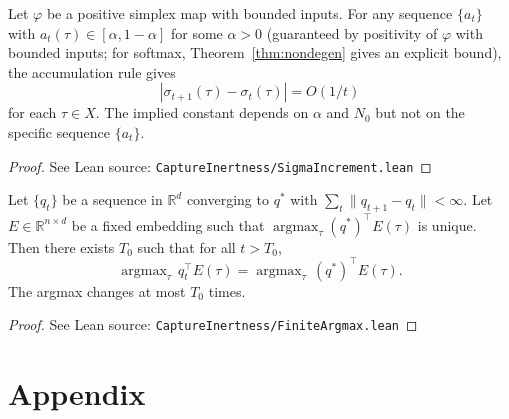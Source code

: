 \begin{lemma}
\label{lem:sigma_increment}
\leanok
{}
Let $\varphi$ be a positive simplex map with bounded inputs.  For any sequence $\{a_t\}$ with $a_t(\tau) \in [\alpha, 1-\alpha]$ for some $\alpha > 0$ (guaranteed by positivity of $\varphi$ with bounded inputs; for softmax, Theorem~\ref{thm:nondegen} gives an explicit bound), the accumulation rule gives
\[
|\sigma_{t+1}(\tau) - \sigma_t(\tau)| = O(1/t)
\]
for each $\tau \in X$.  The implied constant depends on $\alpha$ and $N_0$ but not on the specific sequence $\{a_t\}$.
\end{lemma}

\begin{proof}
\leanok
{}
See Lean source: \texttt{CaptureInertness/SigmaIncrement.lean}
\end{proof}

\begin{lemma}
\label{lem:finite_argmax}
\leanok
{}
Let $\{q_t\}$ be a sequence in $\mathbb{R}^d$ converging to $q^*$ with $\sum_t \|q_{t+1} - q_t\| < \infty$.  Let $E \in \mathbb{R}^{n \times d}$ be a fixed embedding such that $\operatorname{argmax}_\tau (q^*)^\top E(\tau)$ is unique.  Then there exists $T_0$ such that for all $t > T_0$,
\[
\operatorname{argmax}_\tau\, q_t^\top E(\tau) = \operatorname{argmax}_\tau\, (q^*)^\top E(\tau).
\]
The argmax changes at most $T_0$ times.
\end{lemma}

\begin{proof}
\leanok
{}
See Lean source: \texttt{CaptureInertness/FiniteArgmax.lean}
\end{proof}

\chapter{Appendix}\label{ch:appendix}

